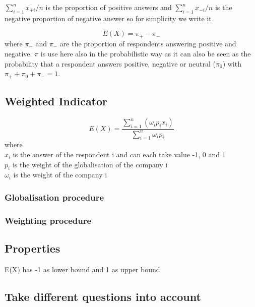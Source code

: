 \documentclass[12pt,a4paper,oneside]{book}
\begin{document}
${\sum_{i=1}^n x_{+i}}/{n}$ is the proportion of positive answers and ${\sum_{i=1}^n x_{-i}}/{n}$ is the negative proportion of negative answer so for simplicity we write it 

\begin{equation}
    E(X) = \pi_+ - \pi_-
\end{equation}
where $\pi_+$ and $\pi_-$ are the proportion of respondents answering positive and negative. $\pi$ is use here also in the probabilistic way as it can also be seen as the probability that a respondent answers positive, negative or neutral ($\pi_0$) with $\pi_+ + \pi_0 + \pi_- =1$.


\subsection{Weighted Indicator}

\begin{equation}
    E(X) = \frac{ \sum_{i=1}^n \left(\omega_i p_i x_i \right)}{\sum_{i=1}^n \omega_i p_i}
\end{equation} 
where \\
$x_i$ is the answer of the respondent i and can each take value -1, 0 and 1 \\
$p_i$ is the weight of the globalisation of the company i \\
$\omega_i$ is the weight of the company i

\subsubsection{Globalisation procedure}



\subsubsection{Weighting procedure}






\subsection{Properties}

E(X) has -1 as lower bound and 1 as upper bound






\subsection{Take different questions into account}
\end{document}
